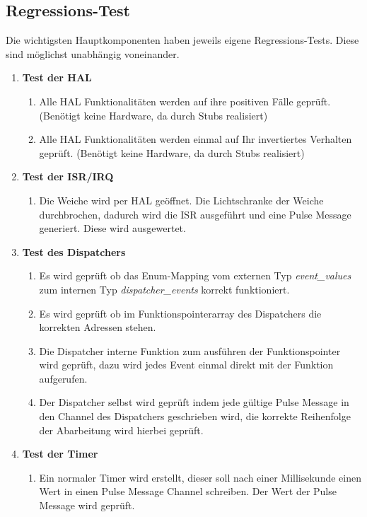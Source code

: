 \documentclass[oneside,a4paper,titlepage]{scrartcl}              %
\begin{document}
\newpage

\subsection{Regressions-Test}
Die wichtigsten Hauptkomponenten haben jeweils eigene Regressions-Tests. Diese sind möglichst unabhängig voneinander.
\begin{enumerate}
  \item \textbf{Test der HAL}
  \begin{enumerate}
    \item Alle HAL Funktionalitäten werden auf ihre positiven Fälle geprüft. (Benötigt keine Hardware, da durch Stubs realisiert)
    \item Alle HAL Funktionalitäten werden einmal auf Ihr invertiertes Verhalten geprüft. (Benötigt keine Hardware, da durch Stubs realisiert)
  \end{enumerate}
  \item \textbf{Test der ISR/IRQ}
  \begin{enumerate}
    \item Die Weiche wird per HAL geöffnet. Die Lichtschranke der Weiche durchbrochen, dadurch wird die ISR ausgeführt und eine Pulse Message generiert. Diese wird ausgewertet.
  \end{enumerate}
  \item \textbf{Test des Dispatchers}
  \begin{enumerate}
    \item Es wird geprüft ob das Enum-Mapping vom externen Typ \emph{event\_values} zum internen Typ \emph{dispatcher\_events} korrekt funktioniert.
    \item Es wird geprüft ob im Funktionspointerarray des Dispatchers die korrekten Adressen stehen.
    \item Die Dispatcher interne Funktion zum ausführen der Funktionspointer wird geprüft, dazu wird jedes Event einmal direkt mit der Funktion aufgerufen.
    \item Der Dispatcher selbst wird geprüft indem jede gültige Pulse Message in den Channel des Dispatchers geschrieben wird, die korrekte Reihenfolge der Abarbeitung wird hierbei geprüft.
  \end{enumerate}
  \item \textbf{Test der Timer}
  \begin{enumerate}
    \item Ein normaler Timer wird erstellt, dieser soll nach einer Millisekunde einen Wert in einen Pulse Message Channel schreiben. Der Wert der Pulse Message wird geprüft.

\end{enumerate}
\end{enumerate}
\end{document}

